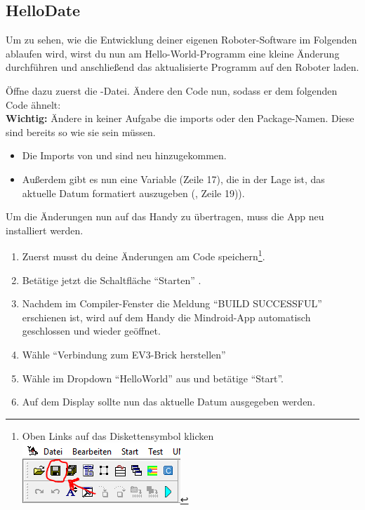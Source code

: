 	\subsection{HelloDate}
		Um zu sehen, wie die Entwicklung deiner eigenen Roboter-Software im Folgenden ablaufen wird, wirst du nun am Hello-World-Programm eine kleine Änderung durchführen und anschließend das aktualisierte Programm auf den Roboter laden.
		
		Öffne dazu zuerst die -Datei. Ändere den Code nun, sodass er dem folgenden Code ähnelt:\\
		\textbf{Wichtig:} Ändere in keiner Aufgabe die imports oder den Package-Namen. Diese sind bereits so wie sie sein müssen.
		
		
		
		\begin{itemize}
		\item Die Imports von  und  sind neu hinzugekommen.
		\item Außerdem gibt es nun eine Variable  (Zeile 17), die in der Lage ist, das aktuelle Datum formatiert auszugeben (, Zeile 19)).
		\end{itemize}
		Um die Änderungen nun auf das Handy zu übertragen, muss die App neu installiert werden.
		\begin{enumerate}
		\item Zuerst musst du deine Änderungen am Code 
		 speichern\footnote{Oben Links auf das Diskettensymbol klicken \includegraphics[]{img/je_savebutton}}. 
		\item Betätige jetzt die Schaltfläche “Starten” .
		\item Nachdem im Compiler-Fenster die Meldung “BUILD SUCCESSFUL” erschienen ist, wird auf dem Handy die Mindroid-App automatisch geschlossen und wieder geöffnet.
		\item Wähle “Verbindung zum EV3-Brick herstellen”
		\item Wähle im Dropdown “HelloWorld” aus und betätige “Start”.
		\item Auf dem Display sollte nun das aktuelle Datum ausgegeben werden.
		
		\end{enumerate}
		
